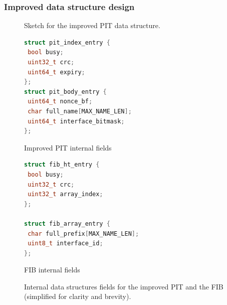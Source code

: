 \documentclass[11pt,a4paper,twoside,titlepage,openany]{book}
\begin{document}
\subsubsection{Improved data structure design}\label{sec:augustus.pit.new}

\begin{figure}[tb]
  \begin{center}
    \caption[Sketch for the improved PIT data structure]{Sketch for the improved PIT data structure.}
    \label{fig:augustus.newpit}
  \end{center}
\end{figure}

\begin{figure}[tb]
  \captionsetup{type=lstlisting}
  \begin{sublstlisting}[t]{.5\linewidth}
  \begin{lstlisting}[language=c]
struct pit_index_entry {
 bool busy;
 uint32_t crc;
 uint64_t expiry;
};
struct pit_body_entry {
 uint64_t nonce_bf;
 char full_name[MAX_NAME_LEN];
 uint64_t interface_bitmask;
};
    \end{lstlisting}
    \caption{Improved PIT internal fields}\label{lst:augustus.newpit}
  \end{sublstlisting}%
  \begin{sublstlisting}[t]{.5\linewidth}
  \begin{lstlisting}[language=c]
struct fib_ht_entry {
 bool busy;
 uint32_t crc;
 uint32_t array_index;
};

struct fib_array_entry {
 char full_prefix[MAX_NAME_LEN];
 uint8_t interface_id;
};
    \end{lstlisting}
    \caption{FIB internal fields}\label{lst:augustus.fib}
  \end{sublstlisting}
  \caption[Internal data structures fields for the improved PIT and the FIB]{Internal data structures fields for the improved PIT and the FIB (simplified for clarity and brevity).}\label{lst:augustus.newpit_fib}
\end{figure}
\end{document}
